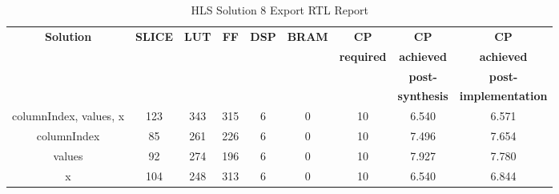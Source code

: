 \begin{table}[H]
	\centering
	\begin{tabular}{|c|c|c|c|c|c|c|c|c|}
		\hline
		\textbf{Solution} & \textbf{SLICE} & \textbf{LUT} & \textbf{FF} & \textbf{DSP} & \textbf{BRAM} & \textbf{CP} & \textbf{CP} & \textbf{CP} \\
		& & & & & & \textbf{required} & \textbf{achieved} & \textbf{achieved}\\
		& & & & & & & \textbf{post-} & \textbf{post-}\\
		& & & & & & & \textbf{synthesis} & \textbf{implementation}\\
		\hline
		columnIndex, values, x  & 123 & 343 & 315 & 6 & 0 & 10 & 6.540 & 6.571 \\
		\hline
		columnIndex  & 85 & 261 & 226 & 6 & 0 & 10 & 7.496 & 7.654 \\
		\hline
		values  & 92 & 274 & 196 & 6 & 0 & 10 & 7.927 & 7.780 \\
		\hline
		x  & 104 & 248 & 313 & 6 & 0 & 10 & 6.540 & 6.844 \\
		\hline
	\end{tabular}
	\caption{HLS Solution 8 Export RTL Report}
	\label{tab:hls-solution-8-export-rtl-report}
\end{table}
